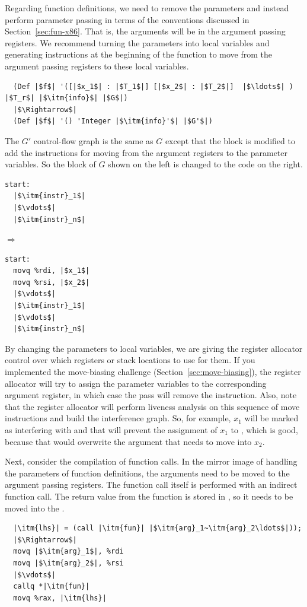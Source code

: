 \documentclass[11pt]{book}
\begin{document}
Regarding function definitions, we need to remove the parameters and
instead perform parameter passing in terms of the conventions
discussed in Section~\ref{sec:fun-x86}. That is, the arguments will be
in the argument passing registers. We recommend turning the parameters
into local variables and generating instructions at the beginning of
the function to move from the argument passing registers to these
local variables.
\begin{lstlisting}
  (Def |$f$| '([|$x_1$| : |$T_1$|] [|$x_2$| : |$T_2$|]  |$\ldots$| ) |$T_r$| |$\itm{info}$| |$G$|)
  |$\Rightarrow$|
  (Def |$f$| '() 'Integer |$\itm{info}'$| |$G'$|)
\end{lstlisting}
The $G'$ control-flow graph is the same as $G$ except that the
 block is modified to add the instructions for moving from
the argument registers to the parameter variables. So the 
block of $G$ shown on the left is changed to the code on the right.
\begin{center}
\begin{minipage}{0.3\textwidth}
\begin{lstlisting}
start:
  |$\itm{instr}_1$|
  |$\vdots$|
  |$\itm{instr}_n$|
\end{lstlisting}
\end{minipage}
$\Rightarrow$
\begin{minipage}{0.3\textwidth}
\begin{lstlisting}
start:
  movq %rdi, |$x_1$|
  movq %rsi, |$x_2$|
  |$\vdots$|
  |$\itm{instr}_1$|
  |$\vdots$|
  |$\itm{instr}_n$|
\end{lstlisting}
\end{minipage}
\end{center}
By changing the parameters to local variables, we are giving the
register allocator control over which registers or stack locations to
use for them. If you implemented the move-biasing challenge
(Section~\ref{sec:move-biasing}), the register allocator will try to
assign the parameter variables to the corresponding argument register,
in which case the  pass will remove the
 instruction. Also, note that the register allocator will
perform liveness analysis on this sequence of move instructions and
build the interference graph. So, for example, $x_1$ will be marked as
interfering with  and that will prevent the assignment of
$x_1$ to , which is good, because that would overwrite the
argument that needs to move into $x_2$.

Next, consider the compilation of function calls. In the mirror image
of handling the parameters of function definitions, the arguments need
to be moved to the argument passing registers.  The function call
itself is performed with an indirect function call. The return value
from the function is stored in , so it needs to be moved
into the .
\begin{lstlisting}
  |\itm{lhs}| = (call |\itm{fun}| |$\itm{arg}_1~\itm{arg}_2\ldots$|));
  |$\Rightarrow$|
  movq |$\itm{arg}_1$|, %rdi
  movq |$\itm{arg}_2$|, %rsi
  |$\vdots$|
  callq *|\itm{fun}|
  movq %rax, |\itm{lhs}|
\end{lstlisting}
\end{document}
